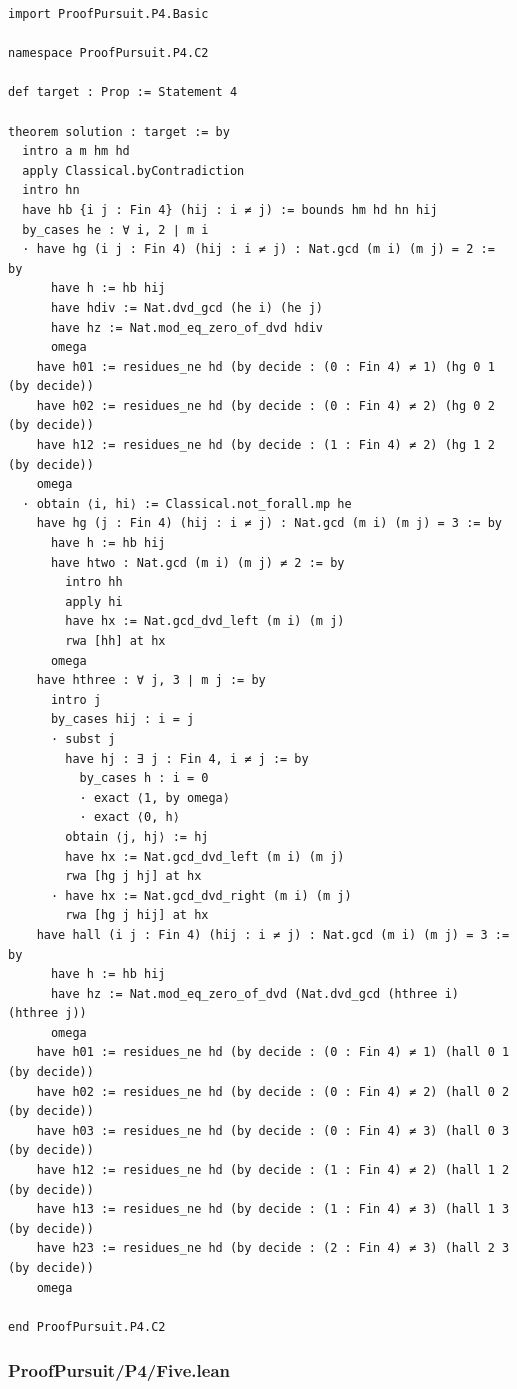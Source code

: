 \documentclass[11pt,a4paper]{article}
\begin{document}
\begin{Verbatim}[breaklines,breakanywhere,fontsize=\footnotesize]
import ProofPursuit.P4.Basic

namespace ProofPursuit.P4.C2

def target : Prop := Statement 4

theorem solution : target := by
  intro a m hm hd
  apply Classical.byContradiction
  intro hn
  have hb {i j : Fin 4} (hij : i ≠ j) := bounds hm hd hn hij
  by_cases he : ∀ i, 2 ∣ m i
  · have hg (i j : Fin 4) (hij : i ≠ j) : Nat.gcd (m i) (m j) = 2 := by
      have h := hb hij
      have hdiv := Nat.dvd_gcd (he i) (he j)
      have hz := Nat.mod_eq_zero_of_dvd hdiv
      omega
    have h01 := residues_ne hd (by decide : (0 : Fin 4) ≠ 1) (hg 0 1 (by decide))
    have h02 := residues_ne hd (by decide : (0 : Fin 4) ≠ 2) (hg 0 2 (by decide))
    have h12 := residues_ne hd (by decide : (1 : Fin 4) ≠ 2) (hg 1 2 (by decide))
    omega
  · obtain ⟨i, hi⟩ := Classical.not_forall.mp he
    have hg (j : Fin 4) (hij : i ≠ j) : Nat.gcd (m i) (m j) = 3 := by
      have h := hb hij
      have htwo : Nat.gcd (m i) (m j) ≠ 2 := by
        intro hh
        apply hi
        have hx := Nat.gcd_dvd_left (m i) (m j)
        rwa [hh] at hx
      omega
    have hthree : ∀ j, 3 ∣ m j := by
      intro j
      by_cases hij : i = j
      · subst j
        have hj : ∃ j : Fin 4, i ≠ j := by
          by_cases h : i = 0
          · exact ⟨1, by omega⟩
          · exact ⟨0, h⟩
        obtain ⟨j, hj⟩ := hj
        have hx := Nat.gcd_dvd_left (m i) (m j)
        rwa [hg j hj] at hx
      · have hx := Nat.gcd_dvd_right (m i) (m j)
        rwa [hg j hij] at hx
    have hall (i j : Fin 4) (hij : i ≠ j) : Nat.gcd (m i) (m j) = 3 := by
      have h := hb hij
      have hz := Nat.mod_eq_zero_of_dvd (Nat.dvd_gcd (hthree i) (hthree j))
      omega
    have h01 := residues_ne hd (by decide : (0 : Fin 4) ≠ 1) (hall 0 1 (by decide))
    have h02 := residues_ne hd (by decide : (0 : Fin 4) ≠ 2) (hall 0 2 (by decide))
    have h03 := residues_ne hd (by decide : (0 : Fin 4) ≠ 3) (hall 0 3 (by decide))
    have h12 := residues_ne hd (by decide : (1 : Fin 4) ≠ 2) (hall 1 2 (by decide))
    have h13 := residues_ne hd (by decide : (1 : Fin 4) ≠ 3) (hall 1 3 (by decide))
    have h23 := residues_ne hd (by decide : (2 : Fin 4) ≠ 3) (hall 2 3 (by decide))
    omega

end ProofPursuit.P4.C2
\end{Verbatim}

\subsubsection{ProofPursuit/P4/Five.lean}\label{proofpursuitp4five.lean}
\end{document}
